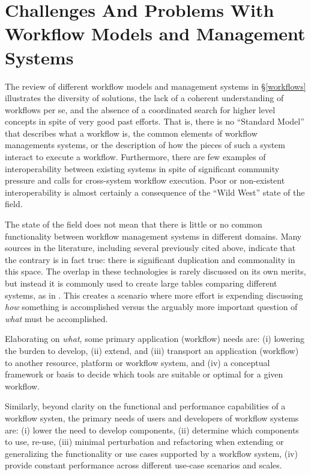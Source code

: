 \section{Challenges And Problems With Workflow Models and Management Systems}\label{commonFunc}

The review of different workflow models and management systems in
\S\ref{workflows} illustrates the diversity of solutions, the lack of a coherent
understanding of workflows per se, and the absence of a coordinated search for
higher level concepts in spite of very good past efforts. That is, there is no
``Standard Model'' that describes what a workflow is, the common elements of
workflow managements systems, or the description of how the pieces of such a
system interact to execute a workflow. Furthermore, there are few examples of
interoperability between existing systems in spite of significant community
pressure and calls for cross-system workflow execution. Poor or non-existent
interoperability is almost certainly a consequence of the ``Wild West'' state of
the field.

The state of the field does not mean that there is little or no common
functionality between workflow management systems in different domains. Many
sources in the literature, including several previously cited above, indicate
that the contrary is in fact true: there is significant duplication and
commonality in this space. The overlap in these technologies is rarely discussed
on its own merits, but instead it is commonly used to create large tables
comparing different systems, as in
\cite{ferreira_da_silva_characterization_nodate}. This creates a scenario where
more effort is expending discussing \textit{how} something is accomplished
versus the arguably more important question of \textit{what} must be
accomplished. 

Elaborating on \textit{what}, some primary application (workflow) needs are:
(i) lowering the burden to  develop, (ii) extend, and (iii) transport an
application (workflow) to another resource, platform or workflow system, and
(iv) a conceptual framework or basis to decide which tools are suitable or
optimal for a given workflow.

Similarly, beyond clarity on the functional and performance capabilities of a
workflow systen, the primary needs of users and developers of workflow systems
are: (i) lower the need to develop components, (ii) determine which components
to use, re-use, (iii) minimal perturbation and refactoring when extending or
generalizing the functionality or use cases supported by a workflow system,
(iv) provide constant performance across different use-case scenarios and
scales.


